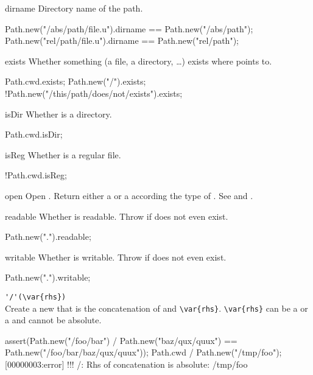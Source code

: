 \begin{urbiscriptapi}
\item[dirname]
  Directory name of the path.
\begin{urbiassert}
Path.new("/abs/path/file.u").dirname == Path.new("/abs/path");
Path.new("rel/path/file.u").dirname  == Path.new("rel/path");
\end{urbiassert}

\item[exists]
  Whether something (a file, a directory, \ldots) exists where
  \this points to.
\begin{urbiassert}
Path.cwd.exists;
Path.new("/").exists;
!Path.new("/this/path/does/not/exists").exists;
\end{urbiassert}

\item[isDir]
  Whether \this is a directory.
\begin{urbiassert}
Path.cwd.isDir;
\end{urbiassert}

\item[isReg]
  Whether \this is a regular file.
\begin{urbiassert}
!Path.cwd.isReg;
\end{urbiassert}

\item[open]
  Open \this. Return either a  or a
   according the type of \this. See
   and .

\item[readable]
  Whether \this is readable.  Throw if does not even exist.
\begin{urbiassert}
Path.new(".").readable;
\end{urbiassert}

\item[writable]
  Whether \this is writable.  Throw if does not even exist.
\begin{urbiassert}
Path.new(".").writable;
\end{urbiassert}

\item \lstinline|'/'(\var{rhs})|\\
  Create a new  that is the concatenation of
  \this and \lstinline|\var{rhs}|. \lstinline|\var{rhs}|
  can be a  or a  and cannot be absolute.
\begin{urbiscript}
assert(Path.new("/foo/bar") / Path.new("baz/qux/quux")
       == Path.new("/foo/bar/baz/qux/quux"));
Path.cwd / Path.new("/tmp/foo");
[00000003:error] !!! /: Rhs of concatenation is absolute: /tmp/foo
\end{urbiscript}


\end{urbiscriptapi}
